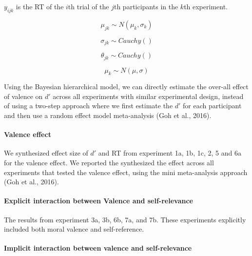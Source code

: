 \documentclass[
  english,
  man]{apa6}
\let\oldparagraph\paragraph
\renewcommand{\paragraph}[1]{\oldparagraph{#1}\mbox{}}
\begin{document}
\(y_{ijk}\) is the RT of the \(i\)th trial of the \(j\)th participants in the \(k\)th experiment.

\[\mu_{jk} \sim N(\mu_{k}, \sigma_{k})\]

\[\sigma_{jk} \sim Cauchy()\]

\[\theta_{jk} \sim Cauchy()\]

\[\mu_{k} \sim N(\mu, \sigma)\]

Using the Bayesian hierarchical model, we can directly estimate the over-all effect of valence on \(d'\) across all experiments with similar experimental design, instead of using a two-step approach where we first estimate the \(d'\) for each participant and then use a random effect model meta-analysis (Goh et al., 2016).

\hypertarget{valence-effect}{%
\paragraph{Valence effect}\label{valence-effect}}

We synthesized effect size of \(d'\) and RT from experiment 1a, 1b, 1c, 2, 5 and 6a for the valence effect. We reported the synthesized the effect across all experiments that tested the valence effect, using the mini meta-analysis approach (Goh et al., 2016).

\hypertarget{explicit-interaction-between-valence-and-self-relevance}{%
\paragraph{Explicit interaction between Valence and self-relevance}\label{explicit-interaction-between-valence-and-self-relevance}}

The results from experiment 3a, 3b, 6b, 7a, and 7b. These experiments explicitly included both moral valence and self-reference.

\hypertarget{implicit-interaction-between-valence-and-self-relevance}{%
\paragraph{Implicit interaction between valence and self-relevance}\label{implicit-interaction-between-valence-and-self-relevance}}
\end{document}
